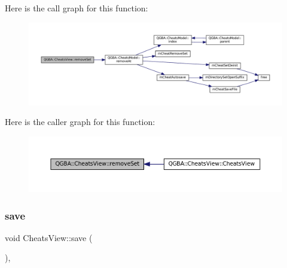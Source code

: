 Here is the call graph for this function\+:
\nopagebreak
\begin{figure}[H]
\begin{center}
\leavevmode
\includegraphics[width=350pt]{class_q_g_b_a_1_1_cheats_view_a43e93973388591b6a0d79dc046980561_cgraph}
\end{center}
\end{figure}
Here is the caller graph for this function\+:
\nopagebreak
\begin{figure}[H]
\begin{center}
\leavevmode
\includegraphics[width=350pt]{class_q_g_b_a_1_1_cheats_view_a43e93973388591b6a0d79dc046980561_icgraph}
\end{center}
\end{figure}
\mbox{\label{class_q_g_b_a_1_1_cheats_view_acc7c4f014670cccb752cde7ad6e85597}} 
\subsubsection{\texorpdfstring{save}{save}}
{\footnotesize\ttfamily void Cheats\+View\+::save (\begin{DoxyParamCaption}{ }\end{DoxyParamCaption})\hspace{0.3cm}{\ttfamily [private]}, {\ttfamily [slot]}}

